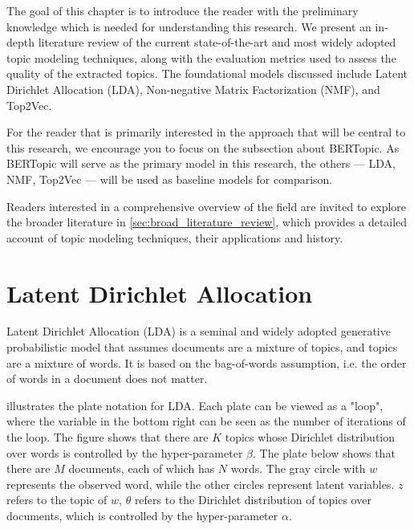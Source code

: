 The goal of this chapter is to introduce the reader with the preliminary knowledge which is needed for understanding this research. We present an in-depth literature review of the current state-of-the-art and most widely adopted topic modeling techniques, along with the evaluation metrics used to assess the quality of the extracted topics. The foundational models discussed include Latent Dirichlet Allocation (LDA), Non-negative Matrix Factorization (NMF), and Top2Vec.

For the reader that is primarily interested in the approach that will be central to this research, we encourage you to focus on the subsection about BERTopic. As BERTopic will serve as the primary model in this research, the others — LDA, NMF, Top2Vec — will be used as baseline models for comparison.

Readers interested in a comprehensive overview of the field are invited to explore the broader literature in \cref{sec:broad_literature_review}, which provides a detailed account of topic modeling techniques, their applications and history.

\section{Latent Dirichlet Allocation}
\label{sec:latent_dirichlet_allocation}
Latent Dirichlet Allocation (LDA) \cite{blei_latent_2001} is a seminal and widely adopted generative probabilistic model that assumes documents are a mixture of topics, and topics are a mixture of words. It is based on the bag-of-words assumption, i.e. the order of words in a document does not matter.

 illustrates the plate notation for LDA. Each plate can be viewed as a "loop", where the variable in the bottom right can be seen as the number of iterations of the loop. The figure shows that there are $K$ topics whose Dirichlet distribution over words is controlled by the hyper-parameter $\beta$. The plate below shows that there are $M$ documents, each of which has $N$ words. The gray circle with $w$ represents the observed word, while the other circles represent latent variables. $z$ refers to the topic of $w$, $\theta$ refers to the Dirichlet distribution of topics over documents, which is controlled by the hyper-parameter $\alpha$.

